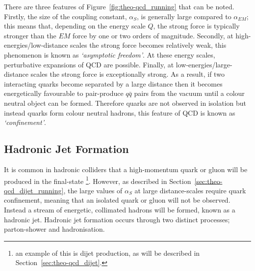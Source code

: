 There are three features of Figure~\ref{fig:theo-qcd_running} that can be noted.
Firstly, the size of the coupling constant, $\alpha_S$, is generally large compared to $\alpha_{EM}$;
this means that, depending on the energy scale $Q$, the strong force is typically stronger than the $EM$ force by one or two orders of magnitude.
Secondly, at high-energies/low-distance scales the strong force becomes relatively weak, this phenomenon is known as
\textit{`asymptotic freedom'}.
At these energy scales, perturbative expansions of QCD are possible.
Finally, at low-energies/large-distance scales the strong force is exceptionally strong.
As a result, if two interacting quarks become separated by a large distance then it becomes energetically favourable to
pair-produce $q\bar{q}$ pairs from the vacuum until a colour neutral object can be formed.
Therefore quarks are not observed in isolation but instead quarks form colour neutral hadrons, this feature of QCD is known as \textit{`confinement'}.

\subsection{Hadronic Jet Formation}
\label{sec:theo-qcd_jets}

It is common in hadronic colliders that a high-momentum quark or gluon will be produced in the final-state
\footnote{an example of this is dijet production, as will be described in Section~\ref{sec:theo-qcd_dijet}.}.
However, as described in Section~\ref{sec:theo-qcd_dijet_running},
the large values of $\alpha_S$ at large distance-scales require quark confinement, meaning that an isolated quark or gluon will not be observed.
Instead a stream of energetic, collimated hadrons will be formed, known as a hadronic jet.
Hadronic jet formation occurs through two distinct processes; parton-shower and hadronisation.


